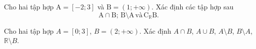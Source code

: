 \begin{bt}%
	Cho hai tập hợp $\mathrm{A}=[-2; 3]$ và $\mathrm{B}=(1;+\infty)$. Xác định các tập hợp sau
	$$
	\mathrm{A} \cap \mathrm{B};\, \mathrm{B} \setminus \mathrm{A}\, \text {và}\, \mathrm{C}_{\mathbb{R}} \mathrm{B}.
	$$
	\loigiai{\begin{multicols}{3}
			\begin{enumerate}[$\bullet$]
				\item $\mathrm{A} \cap \mathrm{B}=(1;3]$;
				\item $\mathrm{B} \setminus \mathrm{A}=(3;+\infty)$;
				\item $\mathrm{C}_{\mathbb{R}} \mathrm{B}=(-\infty;1]$.		
			\end{enumerate}
		\end{multicols}
		}
\end{bt}

\begin{bt}%
	Cho hai tập hợp $A=[0 ; 3]$, $B=(2 ;+\infty)$. Xác định $A \cap B$, $A \cup B$, $A \setminus B$, $B \setminus A$, $\mathbb{R} \setminus B$.
	\loigiai{\begin{multicols}{3}
			\begin{itemize}
				\item $A \cap B=(2;3]$;
				\item $A \cup B=[0;+\infty)$;
				\item $A \setminus B=[0;2]$;
				\item $B \setminus A=(3;+\infty)$;
				\item $\mathbb{R}\setminus B=(-\infty;2]$.
			\end{itemize}
		\end{multicols}
	}
\end{bt}

